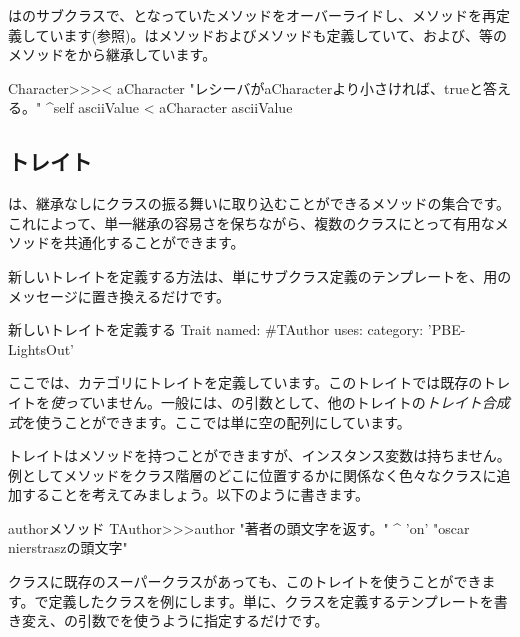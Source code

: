 \documentclass[a4paper,10pt,twoside]{book}
\begin{document}
はのサブクラスで、となっていた\ct{<}メソッドをオーバーライドし、メソッドを再定義しています(参照)。は\ct{=}メソッドおよびメソッドも定義していて、\ct{>=}および\ct{<=}、\ct{~=}等のメソッドをから継承しています。

\begin{method}[CharacterLessThan]{}
Character>>>< aCharacter 
	"レシーバがaCharacterより小さければ、trueと答える。"
	^self asciiValue < aCharacter asciiValue
\end{method}

\subsection{トレイト}
は、継承なしにクラスの振る舞いに取り込むことができるメソッドの集合です。これによって、単一継承の容易さを保ちながら、複数のクラスにとって有用なメソッドを共通化することができます。

新しいトレイトを定義する方法は、単にサブクラス定義のテンプレートを、用のメッセージに置き換えるだけです。

\begin{classdef}[tauthor]{新しいトレイトを定義する}
Trait named: #TAuthor
	uses: { }
	category: 'PBE-LightsOut'
\end{classdef}

\noindent
ここでは、カテゴリにトレイトを定義しています。このトレイトでは既存のトレイトを\emph{使って}いません。一般には、の引数として、他のトレイトの\emph{トレイト合成式}を使うことができます。ここでは単に空の配列にしています。

トレイトはメソッドを持つことができますが、インスタンス変数は持ちません。例としてメソッドをクラス階層のどこに位置するかに関係なく色々なクラスに追加することを考えてみましょう。以下のように書きます。

\begin{method}[author]{authorメソッド}
TAuthor>>>author
    "著者の頭文字を返す。"
	^ 'on'    "oscar nierstraszの頭文字"
\end{method}

\noindent
クラスに既存のスーパークラスがあっても、このトレイトを使うことができます。で定義したクラスを例にします。単に、クラスを定義するテンプレートを書き変え、の引数でを使うように指定するだけです。
\end{document}
